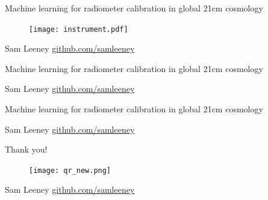 \documentclass{beamer}
\begin{document}
\begin{frame}{\small{Machine learning for radiometer calibration in global 21cm cosmology}}
  \begin{figure}
    \centering
    \texttt{[image: instrument.pdf]}
  \end{figure}
\vfill
\tiny{Sam Leeney \hfill \href{https://github.com/samleeney}{github.com/samleeney}}
\end{frame}

\begin{frame}{\small{Machine learning for radiometer calibration in global 21cm cosmology}}
  \begin{figure}
    \centering
    
  \end{figure}
\vfill
\tiny{Sam Leeney \hfill \href{https://github.com/samleeney}{github.com/samleeney}}
\end{frame}

\begin{frame}{\small{Machine learning for radiometer calibration in global 21cm cosmology}}
  \begin{figure}
    \centering
    
  \end{figure}

  \begin{figure}
    \centering
    
  \end{figure}
\vfill
\tiny{Sam Leeney \hfill \href{https://github.com/samleeney}{github.com/samleeney}}
\end{frame}

\begin{frame}{\small{Thank you!}}
  \begin{figure}
    \centering
    \texttt{[image: qr\_new.png]}
  \end{figure}
\vfill
\tiny{Sam Leeney \hfill \href{https://github.com/samleeney}{github.com/samleeney}}
\end{frame}
\end{document}

